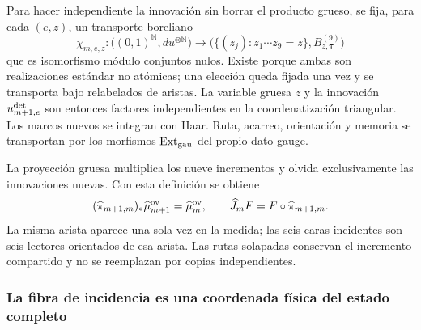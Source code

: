 Para hacer independiente la innovación sin borrar el producto grueso, se fija, para
cada $(e,z)$, un transporte boreliano
\begin{equation}\label{eq:pdf2-ym-owner-bridge-triangularization}
 \chi_{m,e,z}:\bigl((0,1)^{\mathbb N},du^{\otimes\mathbb N}\bigr)
 \longrightarrow
 \bigl(\{(z_j):z_1\cdots z_9=z\},B_{z,\boldsymbol\tau}^{(9)}\bigr)
\end{equation}
que es isomorfismo módulo conjuntos nulos. Existe porque ambas son realizaciones
estándar no atómicas; una elección queda fijada una vez y se transporta bajo
relabelados de aristas. La variable gruesa $z$ y la innovación $u^{\rm det}_{m+1,e}$
son entonces factores independientes en la coordenatización triangular. Los marcos nuevos se
integran con Haar. Ruta, acarreo, orientación y memoria se transportan por los
morfismos $\operatorname{Ext}_{\rm gau}$ del propio dato gauge.

La proyección gruesa multiplica los nueve incrementos y olvida exclusivamente las
innovaciones nuevas. Con esta definición se obtiene
\begin{equation}\label{eq:pdf2-ym-owner-projectivity}
 (\widehat\pi_{m+1,m})_*\widehat\mu_{m+1}^{\rm ov}
 =\widehat\mu_m^{\rm ov},\qquad
 \widehat J_mF=F\circ\widehat\pi_{m+1,m}.
\end{equation}
La misma arista aparece una sola vez en la medida; las seis caras incidentes son seis
lectores orientados de esa arista. Las rutas solapadas conservan el incremento
compartido y no se reemplazan por copias independientes.

\subsubsection{La fibra de incidencia es una coordenada física del estado completo}

